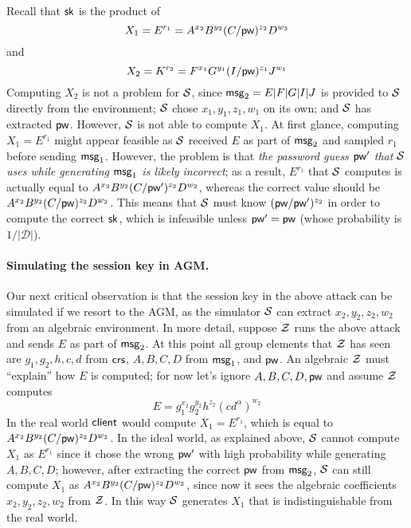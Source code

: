 Recall that $\mathsf{sk}$ is the product of
\[
X_1 = E^{r_1} = A^{x_2}B^{y_2}(C/\mathsf{pw})^{z_2}D^{w_2}
\]
and
\[
X_2 = K^{r_2} = F^{x_1}G^{y_1}(I/\mathsf{pw})^{z_1}J^{w_1}
\]
Computing $X_2$ is not a problem for $\mathcal{S}$, since $\mathsf{msg}_{2} = E|F|G|I|J$ is provided to $\mathcal{S}$ directly from the environment; $\mathcal{S}$ chose $x_1, y_1, z_1, w_1$ on its own; and $\mathcal{S}$ has extracted $\mathsf{pw}$. However, $\mathcal{S}$ is not able to compute $X_1$. At first glance, computing $X_1 = E^{r_1}$ might appear feasible as $\mathcal{S}$ received $E$ as part of $\mathsf{msg}_{2}$ and sampled $r_1$ before sending $\mathsf{msg}_{1}$. However, the problem is that \emph{the password guess $\mathsf{pw}'$ that $\mathcal{S}$ uses while generating $\mathsf{msg}_{1}$ is likely incorrect}; as a result, $E^{r_1}$ that $\mathcal{S}$ computes is actually equal to $A^{x_2}B^{y_2}(C/\mathsf{pw}')^{z_2}D^{w_2}$, whereas the correct value should be $A^{x_2}B^{y_2}(C/\mathsf{pw})^{z_2}D^{w_2}$. This means that $\mathcal{S}$ must know $(\mathsf{pw}/\mathsf{pw}')^{z_2}$ in order to compute the correct $\mathsf{sk}$, which is infeasible unless $\mathsf{pw}'=\mathsf{pw}$ (whose probability is $1/\mathcal{|D|}$).

\paragraph{Simulating the session key in AGM.}

Our next critical observation is that the session key in the above attack can be simulated if we resort to the AGM, as the simulator $\mathcal{S}$ can extract $x_2, y_2, z_2, w_2$ from an algebraic environment. In more detail, suppose $\mathcal{Z}$ runs the above attack and sends $E$ as part of $\mathsf{msg}_{2}$. At this point all group elements that $\mathcal{Z}$ has seen are $g_1,g_2,h,c,d$ from $\mathsf{crs}$, $A,B,C,D$ from $\mathsf{msg}_{1}$, and $\mathsf{pw}$. An algebraic $\mathcal{Z}$ must ``explain'' how $E$ is computed; for now let's ignore $A,B,C,D,\mathsf{pw}$ and assume $\mathcal{Z}$ computes
\[
E = g_1^{x_2}g_2^{y_2}h^{z_2}(cd^\alpha)^{w_2}
\]
In the real world $\mathsf{client}$ would compute $X_1 = E^{r_1}$, which is equal to $A^{x_2}B^{y_2}(C/\mathsf{pw})^{z_2}D^{w_2}$. In the ideal world, as explained above, $\mathcal{S}$ cannot compute $X_1$ as $E^{r_1}$ since it chose the wrong $\mathsf{pw}'$ with high probability while generating $A,B,C,D$; however, after extracting the correct $\mathsf{pw}$ from $\mathsf{msg}_{2}$, $\mathcal{S}$ can still compute $X_1$ as $A^{x_2}B^{y_2}(C/\mathsf{pw})^{z_2}D^{w_2}$, since now it sees the algebraic coefficients $x_2,y_2,z_2,w_2$ from $\mathcal{Z}$. In this way $\mathcal{S}$ generates $X_1$ that is indistinguishable from the real world.

